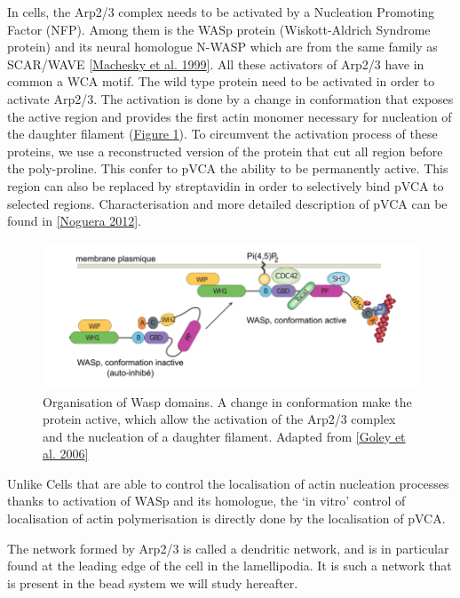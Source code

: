\documentclass[A4paperpaper,11pt,english]{sphinxmanual}
\begin{document}
In cells, the Arp2/3 complex needs to be activated by a Nucleation Promoting
Factor (NFP).  Among them is the  WASp protein (Wiskott-Aldrich Syndrome
protein) and its neural homologue N-WASP which are from the same family as
SCAR/WAVE {\hyperref[index-latex:machesky1999]{{[}Machesky et al. 1999{]}}}.  All these activators of Arp2/3 have in common a
WCA motif. The wild type protein need to be activated in order to activate Arp2/3.
The activation is done by a change in conformation that exposes the active
region and provides the first actin monomer necessary for nucleation of the
daughter filament (\hyperref[index-latex:fig-pwa-deploy]{Figure  \ref*{index-latex:fig-pwa-deploy}}).  To circumvent the activation process of
these proteins, we use a reconstructed version of the protein that cut all
region before the poly-proline. This confer to pVCA the ability to be
permanently active. This region can also be replaced by streptavidin in order
to selectively bind pVCA to selected regions. Characterisation and more
detailed description of pVCA can be found in {\hyperref[index-latex:noguera2012]{{[}Noguera  2012{]}}}.
\begin{figure}[htbp]
\centering
\capstart

\includegraphics[width=0.600\linewidth]{pwa-deploy.png}
\caption{Organisation of Wasp domains. A change in conformation make the protein
active, which allow the activation of the Arp2/3 complex and the nucleation
of a daughter filament.  Adapted from {\hyperref[index-latex:goley2006]{{[}Goley et al. 2006{]}}}}\label{index-latex:fig-pwa-deploy}\end{figure}

Unlike Cells that are able to control the localisation of actin nucleation
processes thanks to activation of WASp and its homologue, the `in vitro' control
of localisation of actin polymerisation is directly done by the localisation of
pVCA.

The network formed by Arp2/3 is called a dendritic network, and is in
particular found at the leading edge of the cell in the lamellipodia. It is
such a network that is present in the bead system we will study hereafter.
\end{document}
